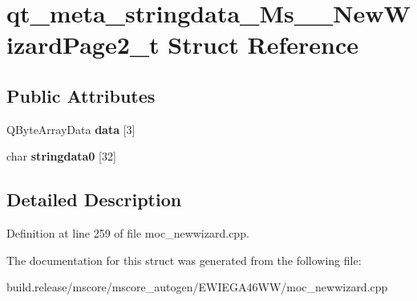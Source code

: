\hypertarget{structqt__meta__stringdata___ms_____new_wizard_page2__t}{}\section{qt\+\_\+meta\+\_\+stringdata\+\_\+\+Ms\+\_\+\+\_\+\+New\+Wizard\+Page2\+\_\+t Struct Reference}
\label{structqt__meta__stringdata___ms_____new_wizard_page2__t}
\subsection*{Public Attributes}
\begin{DoxyCompactItemize}
\item 
\mbox{\label{structqt__meta__stringdata___ms_____new_wizard_page2__t_a23229b6e1053391353cb8d354d5b3a49}} 
Q\+Byte\+Array\+Data {\bfseries data} \mbox{[}3\mbox{]}
\item 
\mbox{\label{structqt__meta__stringdata___ms_____new_wizard_page2__t_aae75f147b78a89f0df427401cdaeeca2}} 
char {\bfseries stringdata0} \mbox{[}32\mbox{]}
\end{DoxyCompactItemize}


\subsection{Detailed Description}


Definition at line 259 of file moc\+\_\+newwizard.\+cpp.



The documentation for this struct was generated from the following file\+:\begin{DoxyCompactItemize}
\item 
build.\+release/mscore/mscore\+\_\+autogen/\+E\+W\+I\+E\+G\+A46\+W\+W/moc\+\_\+newwizard.\+cpp\end{DoxyCompactItemize}
